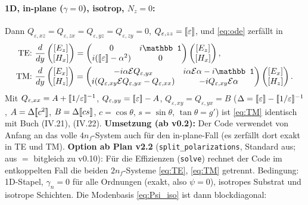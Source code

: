 \paragraph{1D, in-plane ($\gamma=0$), isotrop, $N_z=0$:} Dann $Q_{\varepsilon,xz}=Q_{\varepsilon,zx}=Q_{\varepsilon,yz}=
Q_{\varepsilon,zy}=0$, $Q_{\varepsilon,zz}=[\![\varepsilon]\!]$, und \eqref{eq:ode} zerfällt in
\begin{align}
  \text{TE: }&\frac{d}{dy}\begin{pmatrix}[E_z]\\{}[H_x]\end{pmatrix}=
   \begin{pmatrix}0&i\mathbb 1\\ i(\tp{\varepsilon}-\alpha^2)&0\end{pmatrix}\begin{pmatrix}[E_z]\\{}[H_x]\end{pmatrix},
   \label{eq:TE}\\
  \text{TM: }&\frac{d}{dy}\begin{pmatrix}[E_x]\\{}[H_z]\end{pmatrix}=
   \begin{pmatrix}-i\alpha\mathcal EQ_{\varepsilon,yx}& i\alpha\mathcal E\alpha-i\mathbb 1\\
   i(Q_{\varepsilon,xy}\mathcal EQ_{\varepsilon,yx}-Q_{\varepsilon,xx})&-iQ_{\varepsilon,xy}\mathcal E\alpha\end{pmatrix}
   \begin{pmatrix}[E_x]\\{}[H_z]\end{pmatrix}.\label{eq:TM}
\end{align}
Mit $Q_{\varepsilon,xx}=A+[\![1/\varepsilon]\!]^{-1}$, $Q_{\varepsilon,yy}=[\![\varepsilon]\!]-A$, $Q_{\varepsilon,xy}=Q_{\varepsilon,yx}=B$
($\Delta=[\![\varepsilon]\!]-[\![1/\varepsilon]\!]^{-1}$, $A=\Delta[\![c^2]\!]$, $B=\Delta[\![cs]\!]$, $c=\cos\theta$, $s=\sin\theta$,
$\tan\theta=g'$) ist \eqref{eq:TM} identisch mit Buch (IV.21), (IV.22).
\textbf{Umsetzung (ab v0.2):} Der Code verwendet von Anfang an das volle $4n_f$-System auch für
den in-plane-Fall (es zerfällt dort exakt in TE und TM).
\textbf{Option ab Plan v2.2} (\verb|split_polarizations|, Standard aus; aus $=$ bitgleich zu v0.10): Für die
Effizienzen (\verb|solve|) rechnet der Code im entkoppelten Fall die beiden $2n_f$-Systeme \eqref{eq:TE},
\eqref{eq:TM} getrennt. Bedingung: 1D-Stapel, $\gamma_n=0$ für alle Ordnungen (exakt, also $\psi=0$),
isotropes Substrat und isotrope Schichten. Die Modenbasis \eqref{eq:Psi_iso} ist dann blockdiagonal:

